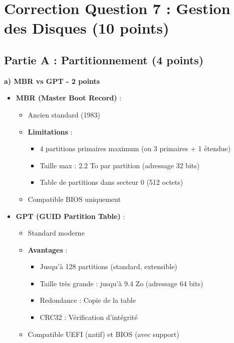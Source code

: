 \documentclass[12pt,a4paper]{article}
\begin{document}
\newpage


\section{Correction Question 7 : Gestion des Disques (10 points)}

\subsection*{Partie A : Partitionnement (4 points)}

\begin{answerbox}
\textbf{a) MBR vs GPT - 2 points}

\begin{itemize}
    \item \textbf{MBR (Master Boot Record)} :
    \begin{itemize}
        \item Ancien standard (1983)
        \item \textbf{Limitations} :
        \begin{itemize}
            \item 4 partitions primaires maximum (ou 3 primaires + 1 étendue)
            \item Taille max : 2.2 To par partition (adressage 32 bits)
            \item Table de partitions dans secteur 0 (512 octets)
        \end{itemize}
        \item Compatible BIOS uniquement
    \end{itemize}
    \item \textbf{GPT (GUID Partition Table)} :
    \begin{itemize}
        \item Standard moderne
        \item \textbf{Avantages} :
        \begin{itemize}
            \item Jusqu'à 128 partitions (standard, extensible)
            \item Taille très grande : jusqu'à 9.4 Zo (adressage 64 bits)
            \item Redondance : Copie de la table
            \item CRC32 : Vérification d'intégrité
        \end{itemize}
        \item Compatible UEFI (natif) et BIOS (avec support)
    \end{itemize}
\end{itemize}


\end{answerbox}
\end{document}
